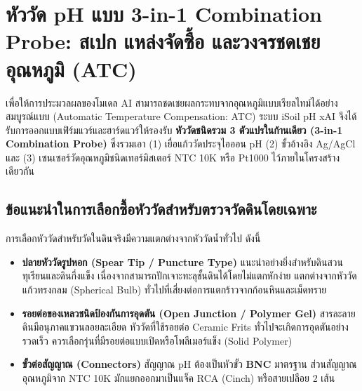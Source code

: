 \documentclass[12pt,a4paper,oneside]{report}
\begin{document}
\section{หัววัด pH แบบ 3-in-1 Combination Probe: สเปก แหล่งจัดซื้อ และวงจรชดเชยอุณหภูมิ (ATC)}
เพื่อให้การประมวลผลของโมเดล AI สามารถชดเชยผลกระทบจากอุณหภูมิแบบเรียลไทม์ได้อย่างสมบูรณ์แบบ (Automatic Temperature Compensation: ATC) ระบบ iSoil pH xAI จึงได้รับการออกแบบเฟิร์มแวร์และฮาร์ดแวร์ให้รองรับ \textbf{หัววัดชนิดรวม 3 ตัวแปรในก้านเดียว (3-in-1 Combination Probe)} ซึ่งรวมเอา (1) เยื่อแก้ววัดประจุไอออน pH (2) ขั้วอ้างอิง Ag/AgCl และ (3) เซนเซอร์วัดอุณหภูมิชนิดเทอร์มิสเตอร์ NTC 10K หรือ Pt1000 ไว้ภายในโครงสร้างเดียวกัน

\subsection{ข้อแนะนำในการเลือกซื้อหัววัดสำหรับตรวจวัดดินโดยเฉพาะ}
การเลือกหัววัดสำหรับวัดในดินจริงมีความแตกต่างจากหัววัดน้ำทั่วไป ดังนี้
\begin{itemize}
    \item \textbf{ปลายหัววัดรูปหอก (Spear Tip / Puncture Type)} แนะนำอย่างยิ่งสำหรับดินสวนทุเรียนและดินกึ่งแข็ง เนื่องจากสามารถปักเจาะทะลุชั้นดินได้โดยไม่แตกหักง่าย แตกต่างจากหัววัดแก้วทรงกลม (Spherical Bulb) ทั่วไปที่เสี่ยงต่อการแตกร้าวจากก้อนหินและเม็ดทราย
    \item \textbf{รอยต่อของเหลวชนิดป้องกันการอุดตัน (Open Junction / Polymer Gel)} สารละลายดินมีอนุภาคแขวนลอยละเอียด หัววัดที่ใช้รอยต่อ Ceramic Frits ทั่วไปจะเกิดการอุดตันอย่างรวดเร็ว ควรเลือกรุ่นที่มีรอยต่อแบบเปิดหรือโพลีเมอร์แข็ง (Solid Polymer)
    \item \textbf{ขั้วต่อสัญญาณ (Connectors)} สัญญาณ pH ต้องเป็นหัวขั้ว \textbf{BNC} มาตรฐาน ส่วนสัญญาณอุณหภูมิจาก NTC 10K มักแยกออกมาเป็นแจ็ค RCA (Cinch) หรือสายเปลือย 2 เส้น
\end{itemize}
\end{document}
